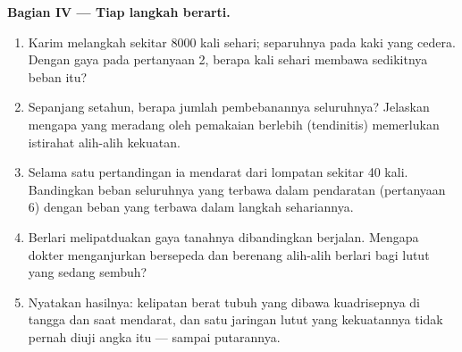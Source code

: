 \begin{problem}
\medskip
\noindent\textbf{Bagian IV --- Tiap langkah berarti.}
\begin{enumerate}[resume]
  \item Karim melangkah sekitar 8000 kali sehari; separuhnya pada kaki
        yang cedera. Dengan gaya pada pertanyaan 2, berapa kali sehari
         membawa sedikitnya beban itu?
  \item Sepanjang setahun, berapa jumlah pembebanannya seluruhnya?
        Jelaskan mengapa  yang meradang oleh pemakaian berlebih
        (tendinitis) memerlukan istirahat alih-alih kekuatan.
  \item Selama satu pertandingan ia mendarat dari lompatan sekitar 40
        kali. Bandingkan beban seluruhnya yang terbawa dalam pendaratan
        (pertanyaan 6) dengan beban yang terbawa dalam langkah
        sehariannya.
  \item Berlari melipatduakan gaya tanahnya dibandingkan berjalan.
        Mengapa dokter menganjurkan bersepeda dan berenang alih-alih
        berlari bagi lutut yang sedang sembuh?
  \item Nyatakan hasilnya: kelipatan berat tubuh yang dibawa 
        kuadrisepnya di tangga dan saat mendarat, dan satu jaringan
        lutut yang kekuatannya tidak pernah diuji angka itu --- sampai
        putarannya.
\end{enumerate}
\end{problem}
